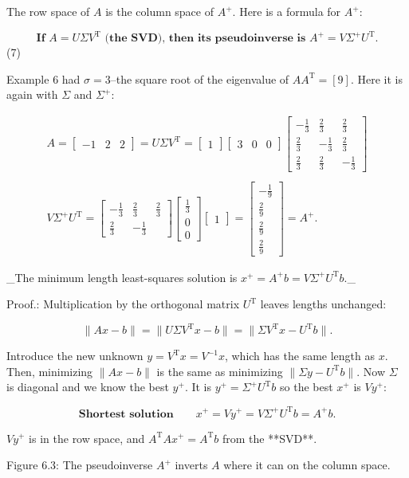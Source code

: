The row space of \(A\) is the column space of \(A^{+}\). Here is a formula for \(A^{+}\):

\[\textbf{If }A=U\Sigma V^{\mathrm{T}}\textbf{ (the SVD), then its pseudoinverse is }A^{+}=V\Sigma^{+}U^{\mathrm{T}}.\] (7)

Example 6 had \(\sigma=3\)--the square root of the eigenvalue of \(AA^{\mathrm{T}}=[9]\). Here it is again with \(\Sigma\) and \(\Sigma^{+}\):

\[\begin{array}{cccc}A=\begin{bmatrix}-1&2&2\end{bmatrix}=U\Sigma V^{\mathrm{T }}=\begin{bmatrix}1\end{bmatrix}\begin{bmatrix}3&0&0\end{bmatrix}\begin{bmatrix} -\frac{1}{3}&\frac{2}{3}&\frac{2}{3}\\ \frac{2}{3}&-\frac{1}{3}&\frac{2}{3}\\ \frac{2}{3}&\frac{2}{3}&-\frac{1}{3}\end{bmatrix}\\ \\ V\Sigma^{+}U^{\mathrm{T}}=\begin{bmatrix}-\frac{1}{3}&\frac{2}{3}&\frac{2}{3} \\ \frac{2}{3}&-\frac{1}{3}\end{bmatrix}\begin{bmatrix}\frac{1}{3}\\ 0\\ 0\end{bmatrix}\begin{bmatrix}1\end{bmatrix}=\begin{bmatrix}-\frac{1}{9}\\ \frac{2}{9}\\ \frac{2}{9}\\ \frac{2}{9}\end{bmatrix}=A^{+}.\end{array}\]

_The minimum length least-squares solution is \(x^{+}=A^{+}b=V\Sigma^{+}U^{\mathrm{T}}b\)._

Proof.: Multiplication by the orthogonal matrix \(U^{\mathrm{T}}\) leaves lengths unchanged:

\[\|Ax-b\|=\|U\Sigma V^{\mathrm{T}}x-b\|=\|\Sigma V^{\mathrm{T}}x-U^{\mathrm{T}} b\|.\]

Introduce the new unknown \(y=V^{\mathrm{T}}x=V^{-1}x\), which has the same length as \(x\). Then, minimizing \(\|Ax-b\|\) is the same as minimizing \(\|\Sigma y-U^{\mathrm{T}}b\|\). Now \(\Sigma\) is diagonal and we know the best \(y^{+}\). It is \(y^{+}=\Sigma^{+}U^{\mathrm{T}}b\) so the best \(x^{+}\) is \(Vy^{+}\):

\[\textbf{Shortest solution}\qquad x^{+}=Vy^{+}=V\Sigma^{+}U^{\mathrm{T}}b=A^{+}b.\]

\(Vy^{+}\) is in the row space, and \(A^{\mathrm{T}}Ax^{+}=A^{\mathrm{T}}b\) from the **SVD**.

Figure 6.3: The pseudoinverse \(A^{+}\) inverts \(A\) where it can on the column space.

 